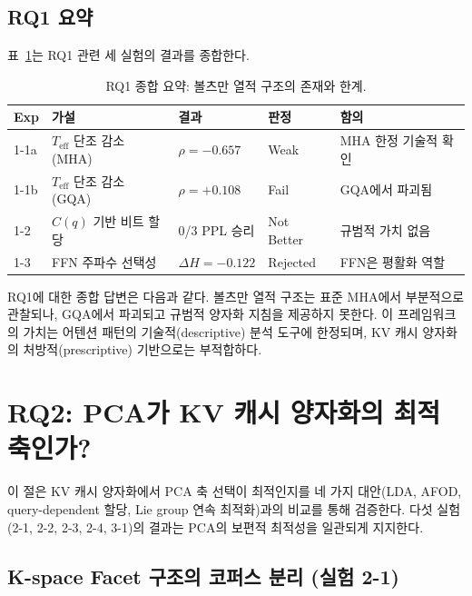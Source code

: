 \documentclass[11pt,a4paper]{article}
\newcommand{\teff}{T_\mathrm{eff}}
\newcommand{\Cq}{C(q)}
\begin{document}
\subsection{RQ1 요약}

표~\ref{tab:rq1_summary}는 RQ1 관련 세 실험의 결과를 종합한다.

\begin{table}[H]
\centering
\caption{RQ1 종합 요약: 볼츠만 열적 구조의 존재와 한계.}
\label{tab:rq1_summary}
\small
\begin{tabularx}{\textwidth}{@{}llll>{\raggedright\arraybackslash}X@{}}
\toprule
\textbf{Exp} & \textbf{가설} & \textbf{결과} & \textbf{판정} & \textbf{함의} \\
\midrule
1-1a & $\teff$ 단조 감소 (MHA) & $\rho = -0.657$ & \textcolor{partial}{Weak} & MHA 한정 기술적 확인 \\
1-1b & $\teff$ 단조 감소 (GQA) & $\rho = +0.108$ & \textcolor{failure}{Fail} & GQA에서 파괴됨 \\
1-2 & $\Cq$ 기반 비트 할당 & 0/3 PPL 승리 & \textcolor{partial}{Not Better} & 규범적 가치 없음 \\
1-3 & FFN 주파수 선택성 & $\Delta H = -0.122$ & \textcolor{failure}{Rejected} & FFN은 평활화 역할 \\
\bottomrule
\end{tabularx}
\end{table}

RQ1에 대한 종합 답변은 다음과 같다. 볼츠만 열적 구조는 표준 MHA에서 부분적으로 관찰되나, GQA에서 파괴되고 규범적 양자화 지침을 제공하지 못한다. 이 프레임워크의 가치는 어텐션 패턴의 기술적(descriptive) 분석 도구에 한정되며, KV 캐시 양자화의 처방적(prescriptive) 기반으로는 부적합하다.

\newpage

\section{RQ2: PCA가 KV 캐시 양자화의 최적 축인가?}

이 절은 KV 캐시 양자화에서 PCA 축 선택이 최적인지를 네 가지 대안(LDA, AFOD, query-dependent 할당, Lie group 연속 최적화)과의 비교를 통해 검증한다. 다섯 실험(2-1, 2-2, 2-3, 2-4, 3-1)의 결과는 PCA의 보편적 최적성을 일관되게 지지한다.

\subsection{K-space Facet 구조의 코퍼스 분리 (실험 2-1)}
\end{document}
